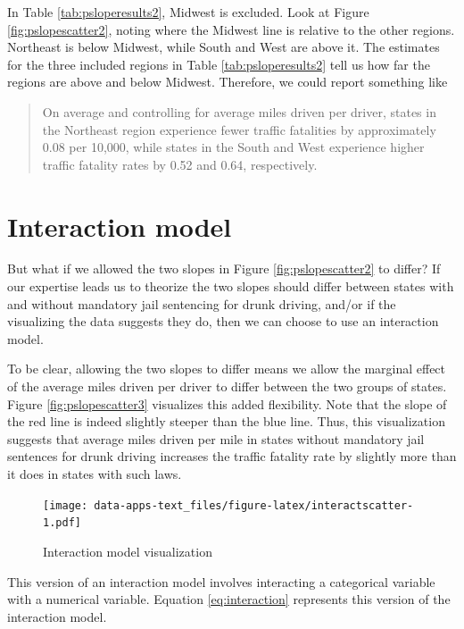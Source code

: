 \documentclass[
]{book}
\begin{document}
In Table \ref{tab:psloperesults2}, Midwest is excluded. Look at Figure \ref{fig:pslopescatter2}, noting where the Midwest line is relative to the other regions. Northeast is below Midwest, while South and West are above it. The estimates for the three included regions in Table \ref{tab:psloperesults2} tell us how far the regions are above and below Midwest. Therefore, we could report something like

\begin{quote}
On average and controlling for average miles driven per driver, states in the Northeast region experience fewer traffic fatalities by approximately 0.08 per 10,000, while states in the South and West experience higher traffic fatality rates by 0.52 and 0.64, respectively.
\end{quote}

\hypertarget{interaction-model}{%
\section{Interaction model}\label{interaction-model}}

But what if we allowed the two slopes in Figure \ref{fig:pslopescatter2} to differ? If our expertise leads us to theorize the two slopes should differ between states with and without mandatory jail sentencing for drunk driving, and/or if the visualizing the data suggests they do, then we can choose to use an interaction model.

To be clear, allowing the two slopes to differ means we allow the marginal effect of the average miles driven per driver to differ between the two groups of states. Figure \ref{fig:pslopescatter3} visualizes this added flexibility. Note that the slope of the red line is indeed slightly steeper than the blue line. Thus, this visualization suggests that average miles driven per mile in states without mandatory jail sentences for drunk driving increases the traffic fatality rate by slightly more than it does in states with such laws.

\begin{figure}
\centering
\texttt{[image: data-apps-text\_files/figure-latex/interactscatter-1.pdf]}
\caption{\label{fig:interactscatter}Interaction model visualization}
\end{figure}

This version of an interaction model involves interacting a categorical variable with a numerical variable. Equation \eqref{eq:interaction} represents this version of the interaction model.
\end{document}

